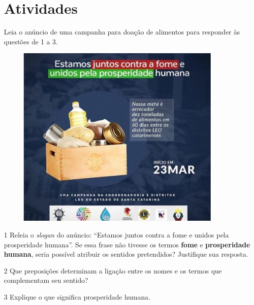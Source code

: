 \section{Atividades}

Leia o anúncio de uma campanha para doação de alimentos para responder às questões de 1 a 3.



\begin{figure}
\centering
\includegraphics[width=3.95833in,height=3.54167in]{./_SAEB_9_POR/media/image31.jpeg}
\end{figure}

\num{1} Releia o \emph{slogan} do anúncio: ``Estamos juntos contra a
fome e unidos pela prosperidade humana''. Se essa frase não tivesse os
termos \textbf{fome} e \textbf{prosperidade humana}, seria possível
atribuir os sentidos pretendidos? Justifique sua resposta.


\num{2} Que preposições determinam a ligação entre os nomes e os termos
que complementam seu sentido?


\num{3} Explique o que significa prosperidade humana.


